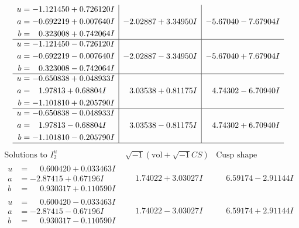 \documentclass[1p]{elsarticle_modified}
\theoremstyle{definition}
\newcommand{\I}{\sqrt{-1}}
\begin{document}
$$\begin{array}{c|c|c}
\begin{aligned}
u &= -1.121450 + 0.726120 I \\
a &= -0.692219 + 0.007640 I \\
b &= \phantom{-}0.323008 + 0.742064 I\end{aligned}
 & -2.02887 + 3.34950 I & -5.67040 - 7.67904 I \\ \hline\begin{aligned}
u &= -1.121450 - 0.726120 I \\
a &= -0.692219 - 0.007640 I \\
b &= \phantom{-}0.323008 - 0.742064 I\end{aligned}
 & -2.02887 - 3.34950 I & -5.67040 + 7.67904 I \\ \hline\begin{aligned}
u &= -0.650838 + 0.048933 I \\
a &= \phantom{-}1.97813 + 0.68804 I \\
b &= -1.101810 + 0.205790 I\end{aligned}
 & \phantom{-}3.03538 + 0.81175 I & \phantom{-}4.74302 - 6.70940 I \\ \hline\begin{aligned}
u &= -0.650838 - 0.048933 I \\
a &= \phantom{-}1.97813 - 0.68804 I \\
b &= -1.101810 - 0.205790 I\end{aligned}
 & \phantom{-}3.03538 - 0.81175 I & \phantom{-}4.74302 + 6.70940 I\\
 \hline 
 \end{array}$$\newpage$$\begin{array}{c|c|c}  
\text{Solutions to }I^u_{2}& \I (\text{vol} + \sqrt{-1}CS) & \text{Cusp shape}\\
 \hline 
\begin{aligned}
u &= \phantom{-}0.600420 + 0.033463 I \\
a &= -2.87415 + 0.67196 I \\
b &= \phantom{-}0.930317 + 0.110590 I\end{aligned}
 & \phantom{-}1.74022 + 3.03027 I & \phantom{-}6.59174 - 2.91144 I \\ \hline\begin{aligned}
u &= \phantom{-}0.600420 - 0.033463 I \\
a &= -2.87415 - 0.67196 I \\
b &= \phantom{-}0.930317 - 0.110590 I\end{aligned}
 & \phantom{-}1.74022 - 3.03027 I & \phantom{-}6.59174 + 2.91144 I \\ \hline\begin{aligned}

\end{aligned}
\end{array}$$
\end{document}
